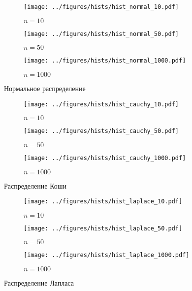 \documentclass[12pt]{article}
\begin{document}
	\begin{figure}[H]
		\centering
		\begin{subfigure}[t]{.3\linewidth}
			\centering\texttt{[image: ../figures/hists/hist\_normal\_10.pdf]}
			\caption*{$n = 10$}
		\end{subfigure}
		\begin{subfigure}[t]{.3\linewidth}
			\centering\texttt{[image: ../figures/hists/hist\_normal\_50.pdf]}
			\caption*{$n = 50$}
		\end{subfigure}
		\begin{subfigure}[t]{.3\linewidth}
			\centering\texttt{[image: ../figures/hists/hist\_normal\_1000.pdf]}
			\caption*{$n = 1000$}
		\end{subfigure}
		\caption{Нормальное распределение}
	\end{figure}
	\begin{figure}[H]
		\centering
		\begin{subfigure}[t]{.3\linewidth}
			\centering\texttt{[image: ../figures/hists/hist\_cauchy\_10.pdf]}
			\caption*{$n = 10$}
		\end{subfigure}
		\begin{subfigure}[t]{.3\linewidth}
			\centering\texttt{[image: ../figures/hists/hist\_cauchy\_50.pdf]}
			\caption*{$n = 50$}
		\end{subfigure}
		\begin{subfigure}[t]{.3\linewidth}
			\centering\texttt{[image: ../figures/hists/hist\_cauchy\_1000.pdf]}
			\caption*{$n = 1000$}
		\end{subfigure}
		\caption{Распределение Коши}
	\end{figure}
	\begin{figure}[H]
		\centering
		\begin{subfigure}[t]{.3\linewidth}
			\centering\texttt{[image: ../figures/hists/hist\_laplace\_10.pdf]}
			\caption*{$n = 10$}
		\end{subfigure}
		\begin{subfigure}[t]{.3\linewidth}
			\centering\texttt{[image: ../figures/hists/hist\_laplace\_50.pdf]}
			\caption*{$n = 50$}
		\end{subfigure}
		\begin{subfigure}[t]{.3\linewidth}
			\centering\texttt{[image: ../figures/hists/hist\_laplace\_1000.pdf]}
			\caption*{$n = 1000$}
		\end{subfigure}
		\caption{Распределение Лапласа}
	\end{figure}
\end{document}
